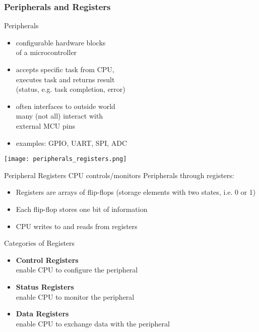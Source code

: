 \subsubsection{Peripherals and Registers}


\begin{definition}{Peripherals}

    \begin{minipage}{0.35\linewidth}
    \begin{itemize}
        \item configurable hardware blocks \\ of a microcontroller
        \item accepts specific task from CPU, \\ executes task and returns result \\ (status, e.g. task completion, error)
        \item often interfaces to outside world\\
        many (not all) interact with \\ external MCU pins 
        \item examples: GPIO, UART, SPI, ADC
    \end{itemize}
    \end{minipage}
    \begin{minipage}{0.64\linewidth}
        \vspace{-5mm}
        \texttt{[image: peripherals\_registers.png]}
    \end{minipage}
\end{definition}


\begin{concept}{Peripheral Registers}
    CPU controls/monitors Peripherals through registers:
    \begin{itemize}
        \item Registers are arrays of flip-flops (storage elements with two states, i.e. 0 or 1)
        \item Each flip-flop stores one bit of information
        \item CPU writes to and reads from registers
    \end{itemize}
\end{concept}

\begin{theorem}{Categories of Registers}
    \begin{itemize}
        \item \textbf{Control Registers} \\
        enable CPU to configure the peripheral
        \item \textbf{Status Registers} \\
        enable CPU to monitor the peripheral
        \item \textbf{Data Registers} \\
        enable CPU to exchange data with the peripheral
    \end{itemize}
\end{theorem}

